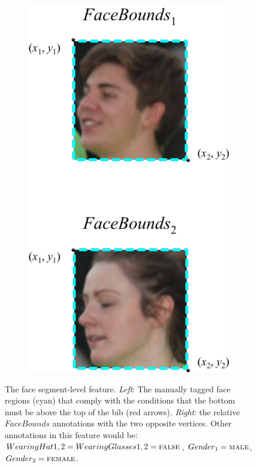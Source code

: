 \begin{figure}[p]
\begin{subfigure}[b]{0.25\textwidth}
    \includegraphics[width=\textwidth]{images/dataset/FaceBounds_Area}
  \end{subfigure}
  \hspace{\fill}
  \caption[Face Bounds segment-level features]{The face segment-level feature. \textit{Left}: The manually tagged face regions (cyan) that comply with the conditions that the bottom must be above the top of the bib (red arrows). \textit{Right}: the relative $FaceBounds$ annotations with the two opposite vertices. Other annotations in this feature would be: $WearingHat{1,2} = WearingGlasses{1,2} = \textsc{false}$, $Gender_{1} = \textsc{male}$, $Gender_{2} = \textsc{female}$.}
  \label{fig:dataset:face_features}
\end{figure}

